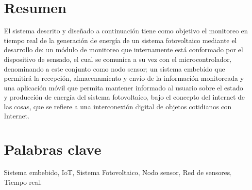 \section{Resumen}
El sistema descrito y diseñado a continuación tiene como objetivo el monitoreo en tiempo real de la generación de energía de un sistema fotovoltaico mediante el desarrollo de: un módulo de monitoreo que internamente está conformado por el dispositivo de sensado, el cual se comunica a su vez con el microcontrolador, denominando a este conjunto como nodo sensor; un sistema embebido que permitirá la recepción, almacenamiento y envío de la información monitoreada y una aplicación móvil que permita mantener informado al usuario sobre el estado y producción de energía  del sistema fotovoltaico, bajo el concepto del internet de las cosas, que se refiere a una interconexión digital de objetos cotidianos con Internet.

\section{Palabras clave}
Sistema embebido, IoT, Sistema Fotovoltaico, Nodo sensor, Red de sensores, Tiempo real.

